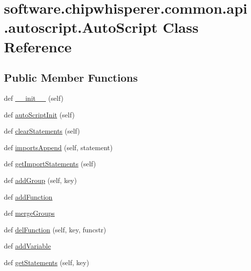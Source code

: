 \hypertarget{classsoftware_1_1chipwhisperer_1_1common_1_1api_1_1autoscript_1_1AutoScript}{}\section{software.\+chipwhisperer.\+common.\+api.\+autoscript.\+Auto\+Script Class Reference}
\label{classsoftware_1_1chipwhisperer_1_1common_1_1api_1_1autoscript_1_1AutoScript}
\subsection*{Public Member Functions}
\begin{DoxyCompactItemize}
\item 
def \hyperlink{classsoftware_1_1chipwhisperer_1_1common_1_1api_1_1autoscript_1_1AutoScript_ac299b9c32ec673e5e635879eaef3fe6f}{\+\_\+\+\_\+init\+\_\+\+\_\+} (self)
\item 
def \hyperlink{classsoftware_1_1chipwhisperer_1_1common_1_1api_1_1autoscript_1_1AutoScript_a3c69c7f2802fd5ec8bb584ae565696ce}{auto\+Script\+Init} (self)
\item 
def \hyperlink{classsoftware_1_1chipwhisperer_1_1common_1_1api_1_1autoscript_1_1AutoScript_a4f7d8dd3f06bf259e6eda96b934a441c}{clear\+Statements} (self)
\item 
def \hyperlink{classsoftware_1_1chipwhisperer_1_1common_1_1api_1_1autoscript_1_1AutoScript_a484cc53883a10d5f0909ef88fa68de77}{imports\+Append} (self, statement)
\item 
def \hyperlink{classsoftware_1_1chipwhisperer_1_1common_1_1api_1_1autoscript_1_1AutoScript_ae608c13569319606166eb762cf8acff4}{get\+Import\+Statements} (self)
\item 
def \hyperlink{classsoftware_1_1chipwhisperer_1_1common_1_1api_1_1autoscript_1_1AutoScript_a3b8c749edaa740112041b148558ff741}{add\+Group} (self, key)
\item 
def \hyperlink{classsoftware_1_1chipwhisperer_1_1common_1_1api_1_1autoscript_1_1AutoScript_a90f73b5a8f90f27011913eb99e678bb1}{add\+Function}
\item 
def \hyperlink{classsoftware_1_1chipwhisperer_1_1common_1_1api_1_1autoscript_1_1AutoScript_a044b5ffe2be0ac3c578cd61bc4213e1e}{merge\+Groups}
\item 
def \hyperlink{classsoftware_1_1chipwhisperer_1_1common_1_1api_1_1autoscript_1_1AutoScript_a7a005331f251e0f4e84933708afe2581}{del\+Function} (self, key, funcstr)
\item 
def \hyperlink{classsoftware_1_1chipwhisperer_1_1common_1_1api_1_1autoscript_1_1AutoScript_af5a20b920ad1dd3bef6613ad22bef287}{add\+Variable}
\item 
def \hyperlink{classsoftware_1_1chipwhisperer_1_1common_1_1api_1_1autoscript_1_1AutoScript_ab8ae6a7895f6cafd5279a81c28404d77}{get\+Statements} (self, key)
\end{DoxyCompactItemize}
